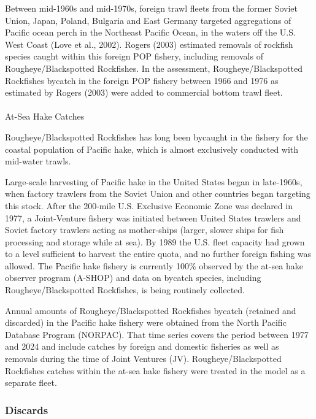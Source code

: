 \documentclass[
]{scrartcl}
\makeatletter
\let\oldparagraph\paragraph
\renewcommand{\paragraph}{
    \@ifstar
      \xxxParagraphStar
      \xxxParagraphNoStar
  }
\newcommand{\xxxParagraphStar}[1]{\oldparagraph*{#1}\mbox{}}
\newcommand{\xxxParagraphNoStar}[1]{\oldparagraph{#1}\mbox{}}
\makeatother
\begin{document}
Between mid-1960s and mid-1970s, foreign trawl fleets from the former
Soviet Union, Japan, Poland, Bulgaria and East Germany targeted
aggregations of Pacific ocean perch in the Northeast Pacific Ocean, in
the waters off the U.S. West Coast (Love et al., 2002). Rogers (2003)
estimated removals of rockfish species caught within this foreign POP
fishery, including removals of Rougheye/Blackspotted Rockfishes. In the
assessment, Rougheye/Blackspotted Rockfishes bycatch in the foreign POP
fishery between 1966 and 1976 as estimated by Rogers (2003) were added
to commercial bottom trawl fleet.

\paragraph{At-Sea Hake Catches}\label{at-sea-hake-catches}

Rougheye/Blackspotted Rockfishes has long been bycaught in the fishery
for the coastal population of Pacific hake, which is almost exclusively
conducted with mid-water trawls.

Large-scale harvesting of Pacific hake in the United States began in
late-1960s, when factory trawlers from the Soviet Union and other
countries began targeting this stock. After the 200-mile U.S. Exclusive
Economic Zone was declared in 1977, a Joint-Venture fishery was
initiated between United States trawlers and Soviet factory trawlers
acting as mother-ships (larger, slower ships for fish processing and
storage while at sea). By 1989 the U.S. fleet capacity had grown to a
level sufficient to harvest the entire quota, and no further foreign
fishing was allowed. The Pacific hake fishery is currently 100\%
observed by the at-sea hake observer program (A-SHOP) and data on
bycatch species, including Rougheye/Blackspotted Rockfishes, is being
routinely collected.

Annual amounts of Rougheye/Blackspotted Rockfishes bycatch (retained and
discarded) in the Pacific hake fishery were obtained from the North
Pacific Database Program (NORPAC). That time series covers the period
between 1977 and 2024 and include catches by foreign and domestic
fisheries as well as removals during the time of Joint Ventures (JV).
Rougheye/Blackspotted Rockfishes catches within the at-sea hake fishery
were treated in the model as a separate fleet.

\subsubsection{Discards}\label{discards}
\end{document}

